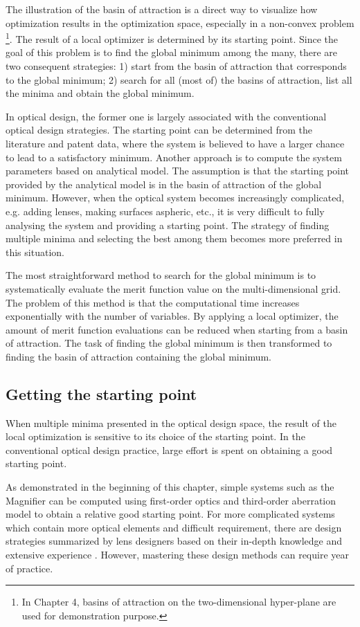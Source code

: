The illustration of the basin of attraction is a direct way to visualize how optimization results in the optimization space, especially in a non-convex problem \footnote{In Chapter 4, basins of attraction on the two-dimensional hyper-plane are used for demonstration purpose. }. The result of a local optimizer is determined by its starting point. Since the goal of this problem is to find the global minimum among the many, there are two consequent strategies: 
1) start from the basin of attraction that corresponds to the global minimum; 
2) search for all (most of) the basins of attraction, list all the minima and obtain the global minimum.

In optical design, the former one is largely associated with the conventional optical design strategies. The starting point can be determined from the literature and patent data, where the system is believed to have a larger chance to lead to a satisfactory minimum. Another approach is to compute the system parameters based on analytical model. The assumption is that the starting point provided by the analytical model is in the basin of attraction of the global minimum.  However, when the optical system becomes increasingly complicated, e.g. adding lenses, making surfaces aspheric, etc., it is very difficult to fully analysing the system and providing a starting point. The strategy of finding multiple minima and selecting the best among them becomes more preferred in this situation. 

The most straightforward method to search for the global minimum is to systematically evaluate the merit function value on the multi-dimensional grid. The problem of this method is that the computational time increases exponentially with the number of variables. By applying a local optimizer, the amount of merit function evaluations can be reduced when starting from a basin of attraction. The task of finding the global minimum is then transformed to finding the basin of attraction containing the global minimum. 

\subsection{Getting the starting point}
When multiple minima presented in the optical design space, the result of the local optimization is sensitive to its choice of the starting point. In the conventional optical design practice, large effort is spent on obtaining a good starting point. 

As demonstrated in the beginning of this chapter, simple systems such as the Magnifier can be computed using first-order optics and third-order aberration model to obtain a relative good starting point. For more complicated systems which contain more optical elements and difficult requirement, there are design strategies summarized by lens designers based on their in-depth knowledge and extensive experience \cite{LivshitsQA2013}\cite{Shafer1995_moreless}. However, mastering these design methods can require year of practice.   

